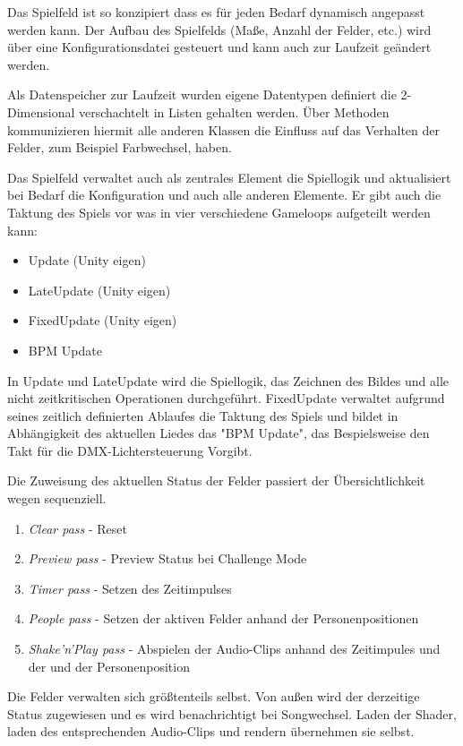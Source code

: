 
Das Spielfeld ist so konzipiert dass es für jeden Bedarf dynamisch angepasst werden kann. Der Aufbau des Spielfelds (Maße, Anzahl der Felder, etc.) wird über eine Konfigurationsdatei gesteuert und kann auch zur Laufzeit geändert werden.

Als Datenspeicher zur Laufzeit wurden eigene Datentypen definiert die 2-Dimensional verschachtelt in Listen gehalten werden. Über Methoden kommunizieren hiermit alle anderen Klassen die Einfluss auf das Verhalten der Felder, zum Beispiel Farbwechsel, haben.

Das Spielfeld verwaltet auch als zentrales Element die Spiellogik und aktualisiert bei Bedarf die Konfiguration und auch alle anderen Elemente. Er gibt auch die Taktung des Spiels vor was in vier verschiedene Gameloops aufgeteilt werden kann:
\begin{itemize}
\item Update (Unity eigen)
\item LateUpdate (Unity eigen)
\item FixedUpdate (Unity eigen)
\item BPM Update
\end{itemize}

In Update und LateUpdate wird die Spiellogik, das Zeichnen des Bildes und alle nicht zeitkritischen Operationen durchgeführt.
FixedUpdate verwaltet aufgrund seines zeitlich definierten Ablaufes die Taktung des Spiels und bildet in Abhängigkeit des aktuellen Liedes das "BPM Update", das Bespielsweise den Takt für die DMX-Lichtersteuerung Vorgibt.

Die Zuweisung des aktuellen Status der Felder passiert der Übersichtlichkeit wegen sequenziell.
\begin{enumerate}
\item \emph{Clear pass} - Reset
\item \emph{Preview pass} - Preview Status bei Challenge Mode
\item \emph{Timer pass} - Setzen des Zeitimpulses
\item \emph{People pass} - Setzen der aktiven Felder anhand der Personenpositionen
\item \emph{Shake'n'Play pass} - Abspielen der Audio-Clips anhand des Zeitimpules und der und der Personenposition
\end{enumerate}

Die Felder verwalten sich größtenteils selbst. Von außen wird der derzeitige Status zugewiesen und es wird benachrichtigt bei Songwechsel. Laden der Shader, laden des entsprechenden Audio-Clips und rendern übernehmen sie selbst.